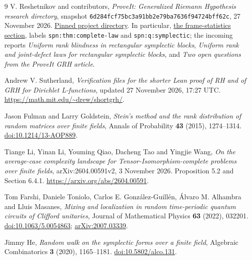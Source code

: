 \documentclass[11pt,letterpaper]{article}
\theoremstyle{definition}
\theoremstyle{remark}
\begin{document}
\begin{thebibliography}{9}
V. Reshetnikov and contributors, \emph{ProveIt: Generalized Riemann Hypothesis research directory}, snapshot \texttt{6d284fcf75bc3a91bb2e79ba7636f94724bff62c}, 27 November 2026.
\href{https://github.com/VladimirReshetnikov/ProveIt/tree/6d284fcf75bc3a91bb2e79ba7636f94724bff62c/Analysis/GeneralizedRiemannHypothesis}{Pinned project directory}.
In particular, \href{https://github.com/VladimirReshetnikov/ProveIt/blob/6d284fcf75bc3a91bb2e79ba7636f94724bff62c/Analysis/GeneralizedRiemannHypothesis/Article/sections/spn.tex}{the frame-statistics section}, labels \texttt{spn:thm:complete-law} and \texttt{spn:q:symplectic}; the incoming reports \emph{Uniform rank blindness in rectangular symplectic blocks}, \emph{Uniform rank and joint-defect laws for rectangular symplectic blocks}, and \emph{Two open questions from the ProveIt GRH article}.

Andrew V. Sutherland, \emph{Verification files for the shorter Lean proof of RH and of GRH for Dirichlet L-functions}, updated 27 November 2026, 17:27 UTC.
\url{https://math.mit.edu/~drew/shortgrh/}.

Jason Fulman and Larry Goldstein, \emph{Stein's method and the rank distribution of random matrices over finite fields}, Annals of Probability \textbf{43} (2015), 1274--1314.
\href{https://doi.org/10.1214/13-AOP889}{doi:10.1214/13-AOP889}.

Tiange Li, Yinan Li, Youming Qiao, Dacheng Tao and Yingjie Wang,
\emph{On the average-case complexity landscape for Tensor-Isomorphism-complete problems over finite fields}, arXiv:2604.00591v2, 3 November 2026. Proposition 5.2 and Section 6.4.1.
\url{https://arxiv.org/abs/2604.00591}.

Tom Farshi, Daniele Toniolo, Carlos E. Gonz\'alez-Guill\'en, \'Alvaro M. Alhambra and Lluis Masanes,
\emph{Mixing and localization in random time-periodic quantum circuits of Clifford unitaries}, Journal of Mathematical Physics \textbf{63} (2022), 032201.
\href{https://doi.org/10.1063/5.0054863}{doi:10.1063/5.0054863}; \href{https://arxiv.org/abs/2007.03339}{arXiv:2007.03339}.

Jimmy He, \emph{Random walk on the symplectic forms over a finite field}, Algebraic Combinatorics \textbf{3} (2020), 1165--1181.
\href{https://doi.org/10.5802/alco.131}{doi:10.5802/alco.131}.
\end{thebibliography}
\end{document}
